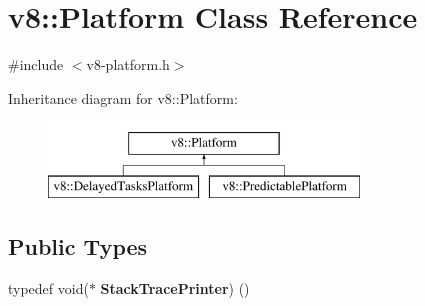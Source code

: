 \hypertarget{classv8_1_1Platform}{}\section{v8\+:\+:Platform Class Reference}
\label{classv8_1_1Platform}


{\ttfamily \#include $<$v8-\/platform.\+h$>$}

Inheritance diagram for v8\+:\+:Platform\+:\begin{figure}[H]
\begin{center}
\leavevmode
\includegraphics[height=2.000000cm]{classv8_1_1Platform}
\end{center}
\end{figure}
\subsection*{Public Types}
\begin{DoxyCompactItemize}
\item 
\mbox{\label{classv8_1_1Platform_aae7b558077a24b6ce9cacfe8e9320943}} 
typedef void($\ast$ {\bfseries Stack\+Trace\+Printer}) ()
\end{DoxyCompactItemize}
